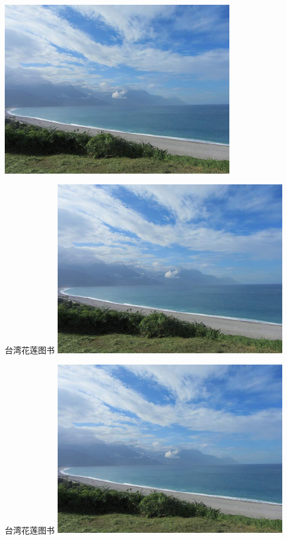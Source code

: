 \begin{Figure}{}
    \includegraphics[width=0.75\textwidth]{./contents/test.jpg}
\end{Figure}

\begin{Figure}{台湾花莲图书}
    \includegraphics[width=0.75\textwidth]{./contents/test.jpg}
\end{Figure}

\begin{Figure}{台湾花莲图书}
    \includegraphics[width=0.75\textwidth]{./contents/test.jpg}
\end{Figure}
